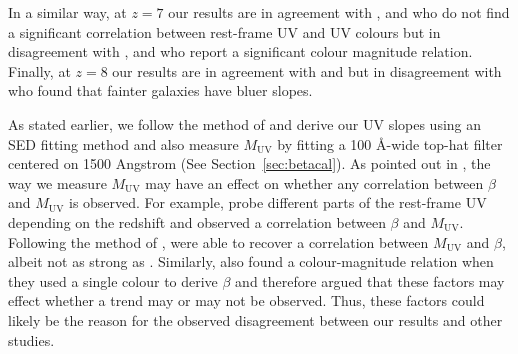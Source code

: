 \documentclass[twocolumn]{aastex63}
\begin{document}
In a similar way, at $z=7$ our results are in agreement with \citet{Dunlop2012}, \citet{Dunlop2013} and \citet{Finkelstein2012} who do not find a significant correlation between rest-frame UV and UV colours but in disagreement with \citet{Wilkins2011}, \citet{Bouwens2012} and \citet{Bouwens2014b} who report a significant colour magnitude relation. Finally, at $z=8$ our results are in agreement with \citet{Finkelstein2012} and \citet{Dunlop2013} but in disagreement with \citet{Bouwens2014b} who found that fainter galaxies have bluer slopes.

As stated earlier, we follow the method of \citet{Finkelstein2012} and derive our UV slopes using an SED fitting method and also measure $M_{\mathrm{UV}}$ by fitting a 100 \AA -wide top-hat filter centered on 1500 Angstrom (See Section~\ref{sec:betacal}). As pointed out in \citet{Finkelstein2012}, the way we measure $M_{\mathrm{UV}}$ may have an effect on whether any correlation between $\beta$ and $M_{\mathrm{UV}}$ is observed. For example, \citet{Bouwens2012} probe different parts of the rest-frame UV depending on the redshift and observed a correlation between $\beta$ and $M_{\mathrm{UV}}$.  Following the method of \citet{Bouwens2012}, \citet{Finkelstein2012} were able to recover a correlation between $M_{\mathrm{UV}}$ and $\beta$, albeit not as strong as \citet{Bouwens2012}. Similarly, \citet{Finkelstein2012} also found a colour-magnitude relation when they used a single colour to derive $\beta$ and therefore argued that these factors may effect whether a trend may or may not be observed. Thus, these factors could likely be the reason for the observed disagreement between our results and other studies.
\end{document}
